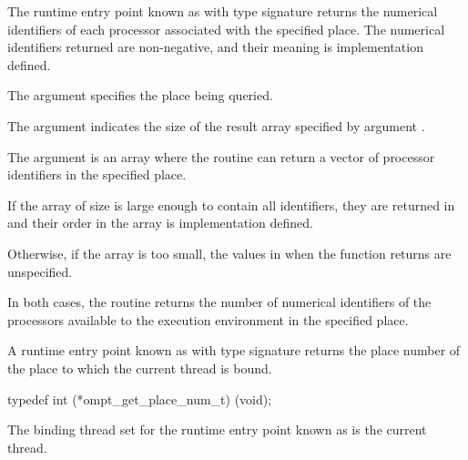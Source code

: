 \descr

The runtime entry point known as
 with type signature
 returns
the numerical identifiers of each processor
associated with the specified place.
The numerical identifiers returned are non-negative, and
their meaning is implementation defined.

\argdesc

The argument  specifies the place being
queried.

The argument  indicates the size of the result
array specified by argument .

The argument  is an array where the routine can return
a vector of processor identifiers in the specified place.

\effect

If the array  of size  is large enough to
contain all identifiers, they are returned in  and
their order in the array is implementation defined.

Otherwise, if the  array is too small, the values in  when the function returns are unspecified.

In both cases, the routine returns the number of numerical identifiers of the processors
available to the execution environment in the specified place.



\label{sec:ompt_get_place_num_t}
\label{sec:ompt_get_place_num}

\summary

A runtime entry point known as
 with type signature
 returns
the place number of the place to which the current
thread is bound.

\format

\begin{ccppspecific}
\begin{omptInquiry}
typedef int (*ompt_get_place_num_t) (void);
\end{omptInquiry}
\end{ccppspecific}

\binding

The binding thread set
for the runtime entry point known as 
is the current thread.

\descr

